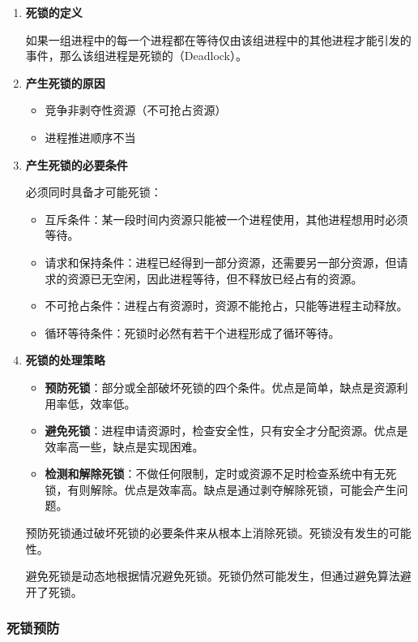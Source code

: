 \documentclass[12pt, a4paper, oneside]{ctexart}
\begin{document}
\begin{enumerate}
  \item {\bf 死锁的定义}
  
  如果一组进程中的每一个进程都在等待仅由该组进程中的其他进程才能引发的事件，那么该组进程是死锁的（Deadlock）。

  \item {\bf 产生死锁的原因}
  
  \begin{itemize}
    \item 竞争非剥夺性资源（不可抢占资源）
    \item 进程推进顺序不当
  \end{itemize}

  \item {\bf 产生死锁的必要条件}
  
  必须同时具备才可能死锁：
  \begin{itemize}
    \item 互斥条件：某一段时间内资源只能被一个进程使用，其他进程想用时必须等待。
    \item 请求和保持条件：进程已经得到一部分资源，还需要另一部分资源，但请求的资源已无空闲，因此进程等待，但不释放已经占有的资源。
    \item 不可抢占条件：进程占有资源时，资源不能抢占，只能等进程主动释放。
    \item 循环等待条件：死锁时必然有若干个进程形成了循环等待。
  \end{itemize}

  \item {\bf 死锁的处理策略}
  
  \begin{itemize}
    \item {\bf 预防死锁}：部分或全部破坏死锁的四个条件。优点是简单，缺点是资源利用率低，效率低。
    \item {\bf 避免死锁}：进程申请资源时，检查安全性，只有安全才分配资源。优点是效率高一些，缺点是实现困难。
    \item {\bf 检测和解除死锁}：不做任何限制，定时或资源不足时检查系统中有无死锁，有则解除。优点是效率高。缺点是通过剥夺解除死锁，可能会产生问题。
  \end{itemize}

  预防死锁通过破坏死锁的必要条件来从根本上消除死锁。死锁没有发生的可能性。

  避免死锁是动态地根据情况避免死锁。死锁仍然可能发生，但通过避免算法避开了死锁。
\end{enumerate}

\subsubsection{死锁预防}
\end{document}
